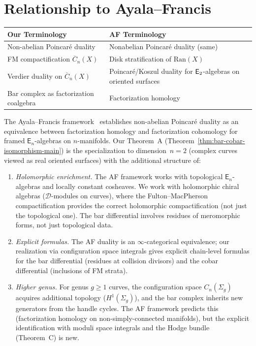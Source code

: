 \section{Relationship to Ayala--Francis}

\begin{tabular}{>{\raggedright\arraybackslash}p{}>{\raggedright\arraybackslash}p{}}
\textbf{Our Terminology} & \textbf{AF Terminology} \\
\hline
Non-abelian Poincar\'{e} duality & Nonabelian Poincar\'{e} duality (same) \\
FM compactification $\overline{C}_n(X)$ & Disk stratification of $\mathrm{Ran}(X)$ \\
Verdier duality on $\overline{C}_n(X)$ & Poincar\'{e}/Koszul duality for $\mathsf{E}_2$-algebras on oriented surfaces \\
Bar complex as factorization coalgebra & Factorization homology \\
\end{tabular}

\begin{remark}\label{rem:ayala-francis-comparison}
The Ayala--Francis framework~\cite{AF15, AF20} establishes non-abelian
Poincar\'{e} duality as an equivalence between factorization homology and
factorization cohomology for framed $\mathsf{E}_n$-algebras on $n$-manifolds.
Our Theorem~A (Theorem~\ref{thm:bar-cobar-isomorphism-main}) is the
specialization to dimension~$n = 2$ (complex curves viewed as real
oriented surfaces) with the additional
structure of:
\begin{enumerate}[label=(\roman*)]
\item \emph{Holomorphic enrichment.}
  The AF framework works with topological $\mathsf{E}_n$-algebras and
  locally constant cosheaves.  We work with holomorphic chiral algebras
  ($\mathcal{D}$-modules on curves), where the Fulton--MacPherson
  compactification provides the correct holomorphic compactification
  (not just the topological one).  The bar differential involves
  residues of meromorphic forms, not just topological data.
\item \emph{Explicit formulas.}
  The AF duality is an $\infty$-categorical equivalence; our realization
  via configuration space integrals gives explicit chain-level formulas
  for the bar differential (residues at collision divisors) and the
  cobar differential (inclusions of FM strata).
\item \emph{Higher genus.}
  For genus $g \geq 1$ curves, the configuration space
  $C_n(\Sigma_g)$ acquires additional topology ($H^1(\Sigma_g)$),
  and the bar complex inherits new generators from the handle
  cycles.  The AF framework predicts this (factorization homology
  on non-simply-connected manifolds), but the explicit identification
  with moduli space integrals and the Hodge bundle (Theorem~C)
  is new.
\end{enumerate}
\end{remark}


